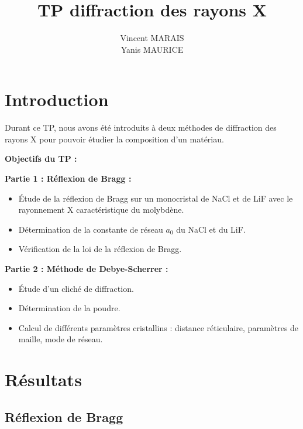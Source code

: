 \documentclass[12pt,a4paper]{article}
\title{TP diffraction des rayons X}
\author{\textup{Vincent MARAIS \\
		Yanis MAURICE}}
\begin{document}
	


\newpage
\tableofcontents

\newpage
\listoffigures
\listoftables

\newpage
	


\clearpage
{}

	

	
	
	

\section{Introduction}
	
Durant ce TP, nous avons été introduits à deux méthodes de diffraction des rayons X pour pouvoir étudier la composition d’un matériau.
\begin{flushleft}
	\textbf{Objectifs du TP :}
	
	\textbf{Partie 1 : Réflexion de Bragg :}
	\begin{itemize}
		\item Étude de la réflexion de Bragg sur un monocristal de NaCl et de LiF avec le rayonnement X caractéristique du molybdène.
		\item Détermination de la constante de réseau $a_0$ du NaCl et du LiF.
		\item Vérification de la loi de la réflexion de Bragg.
	\end{itemize}

\vspace{0.2cm}
	\textbf{Partie 2 : Méthode de Debye-Scherrer :}
	\begin{itemize}
		\item Étude d’un cliché de diffraction.
		\item Détermination de la poudre.
		\item Calcul de différents paramètres cristallins : distance réticulaire, paramètres de maille, mode de réseau.
	\end{itemize}
\end{flushleft}


\vspace{-0.4cm}
\section{Résultats}

\subsection{Réflexion de Bragg}
\end{document}
